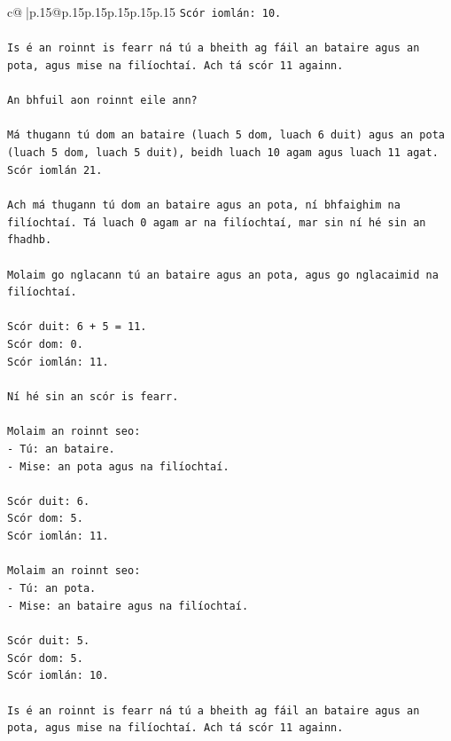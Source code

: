 \documentclass{article}
\begin{document}
{\begin{supertabular}{c@{$\;$}|p{.15\linewidth}@{}p{.15\linewidth}p{.15\linewidth}p{.15\linewidth}p{.15\linewidth}p{.15\linewidth}}
{{{\texttt{Scór iomlán: 10.} \\
\\ 
\texttt{Is é an roinnt is fearr ná tú a bheith ag fáil an bataire agus an pota, agus mise na filíochtaí. Ach tá scór 11 againn.} \\
\\ 
\texttt{An bhfuil aon roinnt eile ann?} \\
\\ 
\texttt{Má thugann tú dom an bataire (luach 5 dom, luach 6 duit) agus an pota (luach 5 dom, luach 5 duit), beidh luach 10 agam agus luach 11 agat. Scór iomlán 21.} \\
\\ 
\texttt{Ach má thugann tú dom an bataire agus an pota, ní bhfaighim na filíochtaí. Tá luach 0 agam ar na filíochtaí, mar sin ní hé sin an fhadhb.} \\
\\ 
\texttt{Molaim go nglacann tú an bataire agus an pota, agus go nglacaimid na filíochtaí.} \\
\\ 
\texttt{Scór duit: 6 + 5 = 11.} \\
\texttt{Scór dom: 0.} \\
\texttt{Scór iomlán: 11.} \\
\\ 
\texttt{Ní hé sin an scór is fearr.} \\
\\ 
\texttt{Molaim an roinnt seo:} \\
\texttt{{-} Tú: an bataire.} \\
\texttt{{-} Mise: an pota agus na filíochtaí.} \\
\\ 
\texttt{Scór duit: 6.} \\
\texttt{Scór dom: 5.} \\
\texttt{Scór iomlán: 11.} \\
\\ 
\texttt{Molaim an roinnt seo:} \\
\texttt{{-} Tú: an pota.} \\
\texttt{{-} Mise: an bataire agus na filíochtaí.} \\
\\ 
\texttt{Scór duit: 5.} \\
\texttt{Scór dom: 5.} \\
\texttt{Scór iomlán: 10.} \\
\\ 
\texttt{Is é an roinnt is fearr ná tú a bheith ag fáil an bataire agus an pota, agus mise na filíochtaí. Ach tá scór 11 againn.} \\
}}}
\end{supertabular}}
\end{document}
